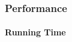 \documentclass[12pt, titlepage]{article}
\begin{document}

\subsubsection{Performance}
		
\paragraph{Running Time}
\end{document}
